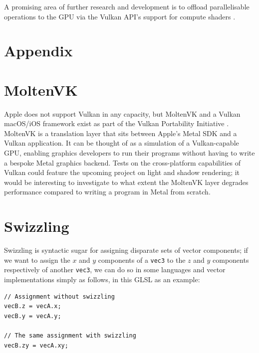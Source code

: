 \documentclass[11pt, a4paper, twocolumn]{article}
\begin{document}
A promising area of further research and development is to offload parallelisable operations to the GPU via the Vulkan API's support for compute shaders \citep{Thomas2014}.






\section*{Appendix}
\appendix

\section{MoltenVK} \label{app:moltenvk}

Apple does not support Vulkan in any capacity, but MoltenVK and a Vulkan macOS/iOS framework exist as part of the Vulkan Portability Initiative \citep{MoltenVK}. MoltenVK is a translation layer that sits between Apple's Metal SDK and a Vulkan application. It can be thought of as a simulation of a Vulkan-capable GPU, enabling graphics developers to run their programs without having to write a bespoke Metal graphics backend. Tests on the cross-platform capabilities of Vulkan could feature the upcoming project on light and shadow rendering; it would be interesting to investigate to what extent the MoltenVK layer degrades performance compared to writing a program in Metal from scratch.

\section{Swizzling} \label{app:swizzle}

Swizzling is syntactic sugar for assigning disparate sets of vector components; if we want to assign the $x$ and $y$ components of a \verb|vec3| to the $z$ and $y$ components respectively of another \verb|vec3|, we can do so in some languages and vector implementations simply as follows, in this GLSL as an example:

\begin{verbatim}
// Assignment without swizzling
vecB.z = vecA.x;
vecB.y = vecA.y;

// The same assignment with swizzling
vecB.zy = vecA.xy;
\end{verbatim}
\end{document}
